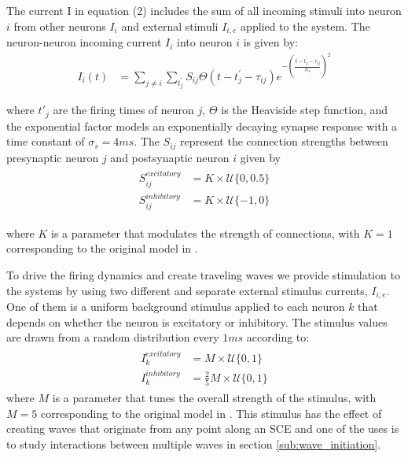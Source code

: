 \documentclass[12pt]{article}
\begin{document}
The current I in equation (2) includes the sum of all incoming stimuli into neuron $i$ from other neurons $I_i$ and external stimuli $I_{i,e}$ applied to the system. 
The neuron-neuron incoming current $I_i$ into neuron $i$ is given by:
\begin{align}
 I_i(t) &= \sum_{j\ne i} \sum_{t^\prime_j} S_{ij}  \Theta(t-t^\prime_j-\tau_{ij})e^{-(\frac{t-t^\prime_j-\tau_{ij}}{\sigma_s})^2}
\end{align}

where $t'_j$ are the firing times of neuron $j$, $\Theta$ is the Heaviside step function, and the exponential factor models an exponentially decaying synapse response with a time constant of $\sigma_s = 4 ms$. 
The $S_{ij}$ represent the connection strengths between presynaptic neuron $j$ and postsynaptic neuron $i$ given by
\begin{align}
 \begin{split}
  S_{ij}^{excitatory} &= K \times \mathcal{U}\{0,0.5 \} \\
  S_{ij}^{inhibitory} &= K \times \mathcal{U}\{-1,0 \} 
 \end{split}
\end{align}

where $K$ is a parameter that modulates the strength of connections, with $K=1$ corresponding to the original model in \parencite{izhikevich2003}. 

To drive the firing dynamics and create traveling waves we provide stimulation to the systems by using two different and separate external stimulus currents, $I_{i,e}$. 
One of them is a uniform background stimulus applied to each neuron $k$ that depends on whether the neuron is excitatory or inhibitory.
The stimulus values are drawn from a random distribution every $1 ms$ according to:
\begin{align}\label{eq:randomstim}
 \begin{split}
  I_k^{excitatory} &= M \times \mathcal{U}\{0,1 \} \\
  I_k^{inhibitory} &= \frac{2}{5} M \times \mathcal{U}\{0,1 \}
 \end{split}
\end{align}
where $M$ is a parameter that tunes the overall strength of the stimulus, with $M=5$ corresponding to the original model in \parencite{izhikevich2003}. 
This stimulus has the effect of creating waves that originate from any point along an SCE and one of the uses is to study interactions between multiple waves in section \ref{sub:wave_initiation}.
\end{document}
